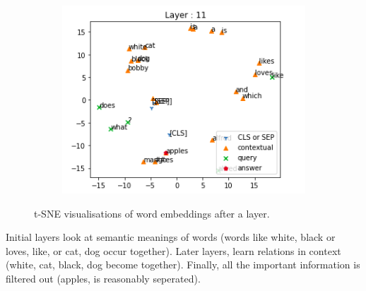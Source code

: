 \documentclass[10pt,twocolumn,letterpaper]{article}
\begin{document}
\begin{figure}[!htp]
\begin{subfigure}[t]{0.65\columnwidth}
    \centering
    \includegraphics[width=\linewidth]{l11.png}
    \end{subfigure}
    \caption{t-SNE visualisations of word embeddings after a layer.}
    \label{fig:plot2}
\end{figure}
Initial layers look at semantic meanings of words (words like white, black or loves, like, or cat, dog occur together). Later layers, learn relations in context (white, cat, black, dog become together). Finally, all the important information is filtered out (apples, is reasonably seperated). 
\end{document}
